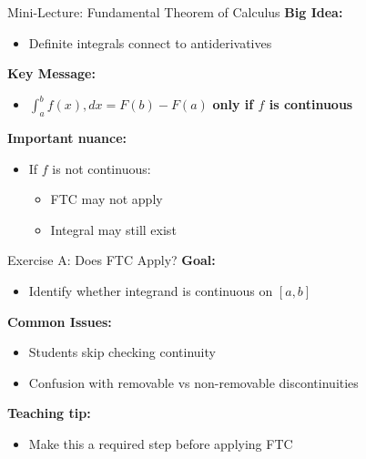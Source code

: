 \documentclass[dvipsnames]{beamer}
\begin{document}

\begin{frame}{Mini-Lecture: Fundamental Theorem of Calculus}
\textbf{Big Idea:}
\begin{itemize}
\item Definite integrals connect to antiderivatives
\end{itemize}

\vspace{1em}

\textbf{Key Message:}
\begin{itemize}
\item $\int_a^b f(x),dx = F(b) - F(a)$ \textbf{only if $f$ is continuous}
\end{itemize}

\vspace{1em}

\textbf{Important nuance:}
\begin{itemize}
\item If $f$ is not continuous:
\begin{itemize}
\item FTC may not apply
\item Integral may still exist
\end{itemize}
\end{itemize}
\end{frame}





\begin{frame}{Exercise A: Does FTC Apply?}
\textbf{Goal:}
\begin{itemize}
\item Identify whether integrand is continuous on $[a,b]$
\end{itemize}

\vspace{1em}

\textbf{Common Issues:}
\begin{itemize}
\item Students skip checking continuity
\item Confusion with removable vs non-removable discontinuities
\end{itemize}

\vspace{1em}

\textbf{Teaching tip:}
\begin{itemize}
\item Make this a required step before applying FTC
\end{itemize}
\end{frame}
\end{document}
